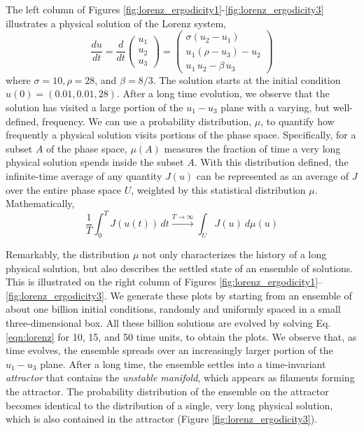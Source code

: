 The left column of Figures \ref{fig:lorenz_ergodicity1}-\ref{fig:lorenz_ergodicity3}
illustrates a physical solution of the Lorenz system,
\begin{equation}
\label{eqn:lorenz}
\frac{du}{dt} =
    \frac{d}{dt}\begin{pmatrix}u_1\\u_2\\u_3\end{pmatrix} =
    \begin{pmatrix}
        \sigma (u_2-u_1) \\
        u_1(\rho -u_3) - u_2 \\
        u_1\,u_2 - \beta\,u_3
\end{pmatrix}
\end{equation}
where $\sigma=10,\rho=28$, and $\beta=8/3$.  The solution starts at the initial
condition $u(0)=(0.01, 0.01, 28)$.  After a long time evolution, we observe that
the solution has visited a large portion of the $u_1-u_3$ plane with a varying, but well-defined, frequency.  We can use a probability distribution, $\mu$, to quantify
how frequently a physical solution visits portions of the phase space.
Specifically, for a subset $A$ of the phase space, $\mu(A)$ measures the
fraction of time a very long physical solution spends inside the subset $A$.
With this distribution defined, the infinite-time average of any quantity $J(u)$ can be represented as an average of $J$ over the entire phase space $U$, weighted
by this statistical distribution $\mu$.  Mathematically,
\begin{equation}
    \frac1T \int_0^T J(u(t))\,dt \xrightarrow{T\to\infty}
    \int_U J(u)\: d\mu(u)
\end{equation}

Remarkably, the distribution $\mu$ not only characterizes the history of
a long physical solution, but also describes the settled state of
an ensemble of solutions.
This is illustrated on the right column of Figures \ref{fig:lorenz_ergodicity1}--\ref{fig:lorenz_ergodicity3}.
We generate these plots by starting from an ensemble of about one billion initial
conditions, randomly and uniformly spaced in a small three-dimensional box.  All these billion solutions are evolved by solving Eq. \ref{eqn:lorenz} for 10, 15, and 50 time units, to obtain the plots. 
We observe that, as time evolves, the ensemble spreads over an increasingly
larger portion of the $u_1-u_3$ plane. After a long time, the ensemble settles into a time-invariant \emph{attractor} that contains the \emph{unstable manifold}, which appears as filaments forming the attractor. The probability distribution of the ensemble on the attractor becomes identical to the distribution of a single, very long physical
solution, which is also contained in the attractor (Figure \ref{fig:lorenz_ergodicity3}).

